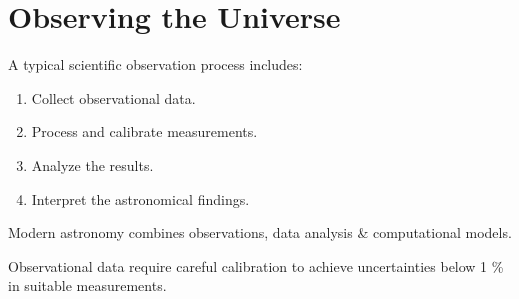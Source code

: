 \section{Observing the Universe}
A typical scientific observation process includes:
\begin{enumerate}
    \item Collect observational data.
    \item Process and calibrate measurements.
    \item Analyze the results.
    \item Interpret the astronomical findings.
\end{enumerate}

Modern astronomy combines observations, data analysis \& computational models.

Observational data require careful calibration to achieve uncertainties below 1 \% in suitable measurements.